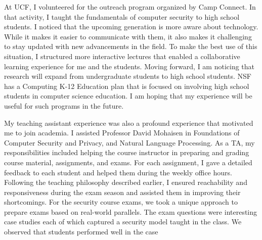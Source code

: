 \documentclass{NSF}
\begin{document}
At UCF, I volunteered for the outreach program organized by Camp Connect. In that activity, I taught the fundamentals of computer security to high school students. I noticed that the upcoming generation is more aware about technology. While it makes it easier to communicate with them, it also makes it challenging to stay updated with new advancements in the field. To make the best use of this situation, I structured more interactive lectures that enabled a collaborative learning experience for me and the students. Moving forward, I am noticing that research will expand from undergraduate students to high school students. NSF has a Computing K-12 Education plan that is focused on involving high school students in computer science education. I am hoping that my experience will be useful for such programs in the future. 


My teaching assistant experience was also a profound experience that motivated me to join academia. I assisted Professor David Mohaisen in Foundations of Computer Security and Privacy, and Natural Language Processing. As a TA, my responsibilities included helping the course instructor in preparing and grading course material, assignments, and exams. For each assignment, I gave a detailed feedback to each student and helped them during the weekly office hours. Following the teaching philosophy described earlier, I ensured reachability and responsiveness during the exam season and assisted them in improving their shortcomings. For the security course exams, we took a unique approach to prepare exams based on real-world parallels. The exam questions were interesting case studies each of which captured a security model taught in the class. We observed that students performed well in the case 
\end{document}
